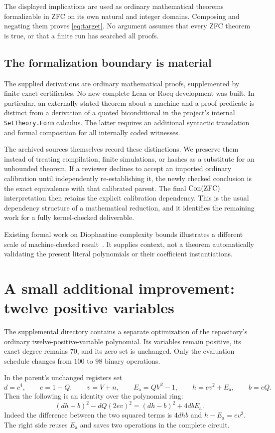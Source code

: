 The displayed implications are used as ordinary mathematical theorems
formalizable in ZFC on its own natural and integer domains. Composing
and negating them proves \eqref{eq:target}. No argument assumes that every
ZFC theorem is true, or that a finite run has searched all proofs.

\subsection{The formalization boundary is material}
The supplied derivations are ordinary mathematical proofs, supplemented
by finite exact certificates. No new complete Lean or Rocq development
was built. In particular, an externally stated theorem about a machine
and a proof predicate is distinct from a derivation of a quoted
biconditional in the project's internal \texttt{SetTheory.Form} calculus.
The latter requires an additional syntactic translation and formal
composition for all internally coded witnesses.

The archived sources themselves record these distinctions. We preserve
them instead of treating compilation, finite simulations, or hashes as
a substitute for an unbounded theorem. If a reviewer declines to accept
an imported ordinary calibration until independently re-establishing it,
the newly checked conclusion is the exact equivalence with that
calibrated parent. The final $\operatorname{Con}(\mathrm{ZFC})$ interpretation then retains the
explicit calibration dependency. This is the usual dependency structure
of a mathematical reduction, and it identifies the remaining work for a
fully kernel-checked deliverable.

Existing formal work on Diophantine complexity bounds illustrates a
different scale of machine-checked result~\cite{bayerdavid}. It supplies
context, not a theorem automatically validating the present literal
polynomials or their coefficient instantiations.

\section{A small additional improvement: twelve positive variables}
\label{sec:supplement}
The supplemental directory contains a separate optimization of the
repository's ordinary twelve-positive-variable polynomial. Its variables
remain positive, its exact degree remains $70$, and its zero set is
unchanged. Only the evaluation schedule changes from $100$ to $98$
binary operations.

In the parent's unchanged registers set
\[
 d=c^4,\qquad e=1-Q,\qquad v=V+n,\qquad
 E_{\mathrm a}=QV^2-1,\qquad h=ev^2+E_{\mathrm a},\qquad b=eQ.
\]
Then the following is an identity over the polynomial ring:
\begin{equation}\label{eq:polarized}
 (dh+b)^2-dQ(2ev)^2=(dh-b)^2+4dbE_{\mathrm a}.
\end{equation}
Indeed the difference between the two squared terms is $4dhb$ and
$h-E_{\mathrm a}=ev^2$. The right side reuses $E_{\mathrm a}$ and saves
two operations in the complete circuit.

